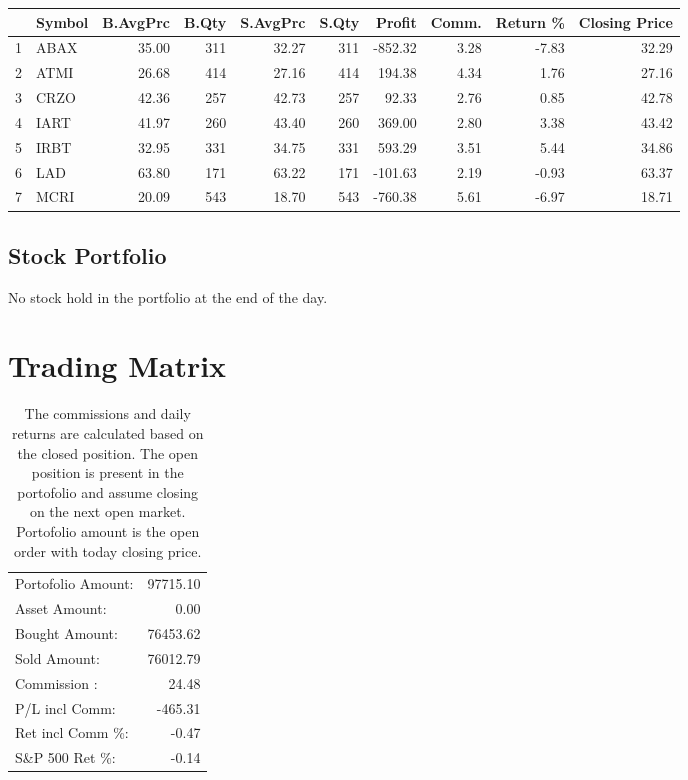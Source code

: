 \documentclass{tufte-handout}\usepackage[]{graphicx}\usepackage[]{color}
\begin{document}
\begin{table}[ht]
\centering
\begin{tabular}{llrrrrrrr|r}
  \hline
 & Symbol & B.AvgPrc & B.Qty & S.AvgPrc & S.Qty & Profit & Comm. & Return \% & Closing Price \\ 
  \hline
1 & ABAX & 35.00 & 311 & 32.27 & 311 & -852.32 & 3.28 & -7.83 & 32.29 \\ 
  2 & ATMI & 26.68 & 414 & 27.16 & 414 & 194.38 & 4.34 & 1.76 & 27.16 \\ 
  3 & CRZO & 42.36 & 257 & 42.73 & 257 & 92.33 & 2.76 & 0.85 & 42.78 \\ 
  4 & IART & 41.97 & 260 & 43.40 & 260 & 369.00 & 2.80 & 3.38 & 43.42 \\ 
  5 & IRBT & 32.95 & 331 & 34.75 & 331 & 593.29 & 3.51 & 5.44 & 34.86 \\ 
  6 & LAD & 63.80 & 171 & 63.22 & 171 & -101.63 & 2.19 & -0.93 & 63.37 \\ 
  7 & MCRI & 20.09 & 543 & 18.70 & 543 & -760.38 & 5.61 & -6.97 & 18.71 \\ 
   \hline
\end{tabular}
\end{table}



\subsection{Stock Portfolio}
No stock hold in the portfolio at the end of the day.


\section{Trading Matrix}

\begin{table}[ht]
\begin{tabular}{lr}
   \hline
Portofolio Amount: & 97715.10 \\ 
  Asset Amount: & 0.00 \\ 
  Bought Amount: & 76453.62 \\ 
  Sold   Amount: & 76012.79 \\ 
  Commission   : & 24.48 \\ 
  P/L incl Comm: & -465.31 \\ 
  Ret incl Comm \%: & -0.47 \\ 
  S\&P 500 Ret \%: & -0.14 \\ 
   \hline
\end{tabular}
\caption{The commissions and daily returns are calculated based on the closed position.
The open position is present in the portofolio and assume closing on the next open market.
Portofolio amount is the open order with today closing price.} 
\end{table}
\end{document}
